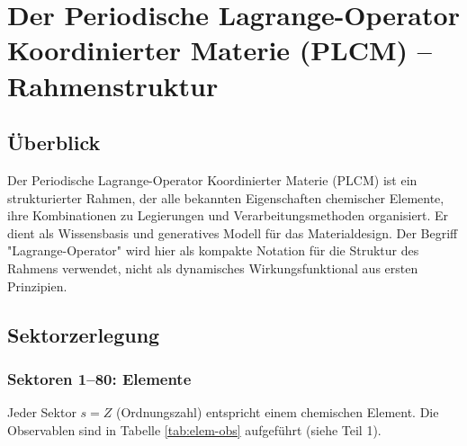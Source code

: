 \documentclass[12pt,a4paper]{article}
\begin{document}
\begin{landscape}
	\vspace{0.2cm}
	\noindent{}
	
	\vspace{0.2cm}
	\noindent\makebox[\linewidth]{%
		\scalebox{0.75}{%
			$\displaystyle
			+
			\underbrace{\lambda_{131} L_{131}^{\text{CALPHAD}}}_{\text{CALPHAD-Integration}}
			+
			\underbrace{\sum_{s=1}^{80} \kappa_{s,131}^{\text{el-CALPHAD}} \,\mathrm{Tr}(\Psi_{s,131} O_s^{\text{el}} O_{131}^{\text{CALPHAD}\dagger})}_{\text{El-CALPHAD-Kopplung}}
			\Bigg]
			\times \prod_{i=1}^{155} \Theta(P_i - P_{i,\text{krit}})
			$
		}
	}
	\label{fig:full-lagrangian}
\end{landscape}

\section{Der Periodische Lagrange-Operator Koordinierter Materie (PLCM) – Rahmenstruktur}

\subsection{Überblick}

Der Periodische Lagrange-Operator Koordinierter Materie (PLCM) ist ein strukturierter Rahmen, der alle bekannten Eigenschaften chemischer Elemente, ihre Kombinationen zu Legierungen und Verarbeitungsmethoden organisiert. Er dient als Wissensbasis und generatives Modell für das Materialdesign. Der Begriff "Lagrange-Operator" wird hier als kompakte Notation für die Struktur des Rahmens verwendet, nicht als dynamisches Wirkungsfunktional aus ersten Prinzipien.

\subsection{Sektorzerlegung}

\subsubsection{Sektoren 1–80: Elemente}
Jeder Sektor \(s = Z\) (Ordnungszahl) entspricht einem chemischen Element. Die Observablen sind in Tabelle \ref{tab:elem-obs} aufgeführt (siehe Teil 1).
\end{document}

